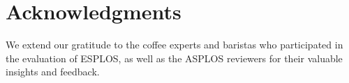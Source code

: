 \section{Acknowledgments}
We extend our gratitude to the coffee experts and baristas who participated in the evaluation of ESPLOS, as well as the ASPLOS reviewers for their valuable insights and feedback.